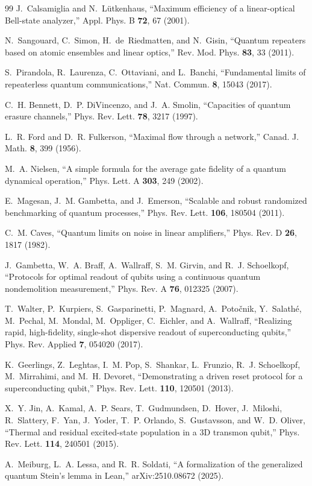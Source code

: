 \documentclass[aps,pra,reprint,nofootinbib,superscriptaddress]{revtex4-2}
\theoremstyle{plain}
\theoremstyle{definition}
\theoremstyle{remark}
\begin{document}
\begin{thebibliography}{99}
J.~Calsamiglia and N.~L\"utkenhaus,
``Maximum efficiency of a linear-optical Bell-state analyzer,''
Appl. Phys. B \textbf{72}, 67 (2001).

N.~Sangouard, C.~Simon, H.~de~Riedmatten, and N.~Gisin,
``Quantum repeaters based on atomic ensembles and linear optics,''
Rev. Mod. Phys. \textbf{83}, 33 (2011).

S.~Pirandola, R.~Laurenza, C.~Ottaviani, and L.~Banchi,
``Fundamental limits of repeaterless quantum communications,''
Nat. Commun. \textbf{8}, 15043 (2017).

C.~H. Bennett, D.~P. DiVincenzo, and J.~A. Smolin,
``Capacities of quantum erasure channels,''
Phys. Rev. Lett. \textbf{78}, 3217 (1997).

L.~R. Ford and D.~R. Fulkerson,
``Maximal flow through a network,''
Canad. J. Math. \textbf{8}, 399 (1956).

M.~A. Nielsen,
``A simple formula for the average gate fidelity of a quantum
dynamical operation,''
Phys. Lett. A \textbf{303}, 249 (2002).

E.~Magesan, J.~M. Gambetta, and J.~Emerson,
``Scalable and robust randomized benchmarking of quantum processes,''
Phys. Rev. Lett. \textbf{106}, 180504 (2011).

C.~M. Caves,
``Quantum limits on noise in linear amplifiers,''
Phys. Rev. D \textbf{26}, 1817 (1982).

J.~Gambetta, W.~A. Braff, A.~Wallraff, S.~M. Girvin, and
R.~J. Schoelkopf,
``Protocols for optimal readout of qubits using a continuous quantum
nondemolition measurement,''
Phys. Rev. A \textbf{76}, 012325 (2007).

T.~Walter, P.~Kurpiers, S.~Gasparinetti, P.~Magnard, A.~Poto\v{c}nik,
Y.~Salath\'e, M.~Pechal, M.~Mondal, M.~Oppliger, C.~Eichler, and
A.~Wallraff,
``Realizing rapid, high-fidelity, single-shot dispersive readout of
superconducting qubits,''
Phys. Rev. Applied \textbf{7}, 054020 (2017).

K.~Geerlings, Z.~Leghtas, I.~M. Pop, S.~Shankar, L.~Frunzio,
R.~J. Schoelkopf, M.~Mirrahimi, and M.~H. Devoret,
``Demonstrating a driven reset protocol for a superconducting qubit,''
Phys. Rev. Lett. \textbf{110}, 120501 (2013).

X.~Y. Jin, A.~Kamal, A.~P. Sears, T.~Gudmundsen, D.~Hover, J.~Miloshi,
R.~Slattery, F.~Yan, J.~Yoder, T.~P. Orlando, S.~Gustavsson, and
W.~D. Oliver,
``Thermal and residual excited-state population in a 3D transmon
qubit,''
Phys. Rev. Lett. \textbf{114}, 240501 (2015).

A.~Meiburg, L.~A. Lessa, and R.~R. Soldati,
``A formalization of the generalized quantum Stein's lemma in Lean,''
arXiv:2510.08672 (2025).

\end{thebibliography}
\end{document}
